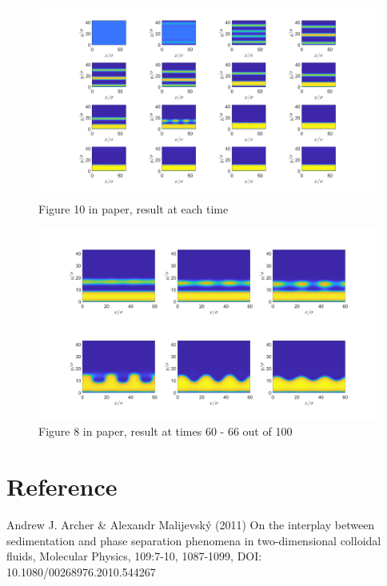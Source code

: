 \documentclass[11pt, a4paper]{article}
\theoremstyle{definition}
\begin{document}
	\begin{figure}[h]
		\centering
		\includegraphics[scale=0.25]{Plotrhobar02.png}
		\caption{Figure 10 in paper, result at each time} 
		\label{F7}
	\end{figure}
	\begin{figure}[h]
		\centering
		\includegraphics[scale=0.25]{rhobar02Zoom60to66.png}
		\caption{Figure 8 in paper, result at times 60 - 66 out of 100} 
		\label{F8}
	\end{figure}
	\section{Reference}
	Andrew J. Archer \& Alexandr Malijevský (2011) On the interplay between sedimentation and phase separation phenomena in two-dimensional colloidal fluids, Molecular Physics, 109:7-10, 1087-1099, DOI: 10.1080/00268976.2010.544267
\end{document}

